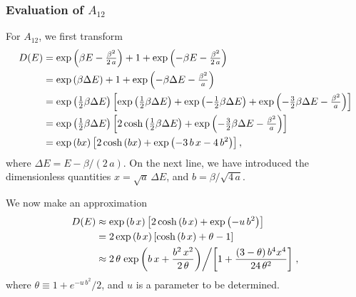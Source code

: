 \documentclass[aip,jcp,preprint,notitlepage, superscriptaddress]{revtex4-1}
\begin{document}
\subsubsection{Evaluation of $A_{12}$}



For $A_{12}$,
we first transform
\begin{align}
D(E)
&=
\exp\left(
  \beta E - \tfrac{ \beta^2 }{ 2 \, a }
\right)
+
1
+
\exp\left(
  -\beta E - \tfrac{ \beta^2 }{ 2 \, a }
\right)
\notag \\
&=
\exp\left(
  \beta \Delta E
\right)
+
1
+
\exp\left(
  -\beta \Delta E - \tfrac{ \beta^2 }{ a }
\right)
\notag \\
&=
\exp\left(
  \tfrac 1 2 \beta \Delta E
\right)
\left[
\exp\left(
  \tfrac 1 2 \beta \Delta E
\right)
+
\exp\left(
  -\tfrac 1 2 \beta \Delta E
\right)
+
\exp\left(
  -\tfrac 3 2 \beta \Delta E
  - \tfrac{ \beta^2 }{ a }
\right)
\right]
\notag \\
&=
\exp\left(
  \tfrac 1 2 \beta \Delta E
\right)
\left[
2 \cosh\left(
  \tfrac 1 2 \beta \Delta E
\right)
+
\exp\left(
  -\tfrac 3 2 \beta \Delta E
  - \tfrac{ \beta^2 }{ a }
\right)
\right]
\notag \\
&=
\exp\left(
  b x
\right)
\left[
2 \cosh\left(
  b x
\right)
+
\exp\left(
  -3 \, b \, x
  -4 \, b^2
\right)
\right],
\label{eq:DE_threeT_exact}
\end{align}
%
where $\Delta E = E - \beta/(2 \, a)$.
%
On the next line,
we have introduced
the dimensionless quantities
$x = \sqrt{a} \, \Delta E$,
and
$b = \beta / \sqrt{4 \, a}$.


We now make an approximation
\begin{align}
D(E)
&\approx
\exp\left(
  b \, x
\right)
\left[
2 \cosh\left(
  b \, x
\right)
+
\exp\left(
  - u \, b^2
\right)
\right]
\label{eq:DE_threeT_approx1}
\\
&=
2 \exp\left(
  b \, x
\right)
\left[
\cosh\left(
  b \, x
\right)
+
\theta - 1
\right]
\notag \\
&\approx
2 \, \theta
\left.
  \exp\left(
    b \, x
    +
    \frac{ b^2 \, x^2 }
    {2 \, \theta}
  \right)
\middle/
\left[
  1
  +
  \frac{ (3 - \theta) \, b^4 x^4 }
  { 24 \, \theta^2 }
\right]
\right.
,
\label{eq:DE_threeT_approx}
\end{align}
%
where
$\theta \equiv 1 + e^{-u \, b^2}/2$,
%
and
$u$ is a parameter to be determined.
\end{document}
